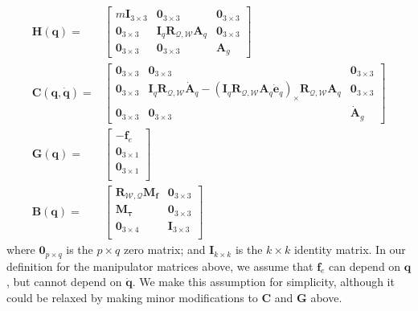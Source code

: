 \begin{equation}
\begin{aligned}
\mathbf{H}(\mathbf{q}) = &
\begin{bmatrix}
m\mathbf{I}_{3\times3} & \mathbf{0}_{3\times3} & \mathbf{0}_{3\times3} \\
\mathbf{0}_{3\times3}                          & \mathbf{I}_{q} \mathbf{R}_{\mathcal{Q},\mathcal{W}} \mathbf{A}_q & \mathbf{0}_{3\times3} \\
\mathbf{0}_{3\times3}                          & \mathbf{0}_{3\times3} & \mathbf{A}_{g}
\end{bmatrix} \\
%
\mathbf{C}(\mathbf{q},\dot{\mathbf{q}}) = &
\begin{bmatrix}
\mathbf{0}_{3\times3} & \mathbf{0}_{3\times3}  & \mathbf{0}_{3\times3} \\
\mathbf{0}_{3\times3} & \mathbf{I}_q \mathbf{R}_{\mathcal{Q},\mathcal{W}} \dot{\mathbf{A}}_q - \left(\mathbf{I}_q \mathbf{R}_{\mathcal{Q},\mathcal{W}} \mathbf{A}_q \dot{\mathbf{e}}_q \right)_{\times}\mathbf{R}_{\mathcal{Q},\mathcal{W}} \mathbf{A}_q & \mathbf{0}_{3\times3} \\
\mathbf{0}_{3\times3} & \mathbf{0}_{3\times3}  & \dot{\mathbf{A}}_g
\end{bmatrix} \\
%
\mathbf{G}(\mathbf{q}) = &
\begin{bmatrix}
-\mathbf{f}_e \\
\mathbf{0}_{3\times1} \\
\mathbf{0}_{3\times1} \\
\end{bmatrix} \\
%
\mathbf{B}(\mathbf{q}) = &
\begin{bmatrix}
\mathbf{R}_{\mathcal{W},\mathcal{Q}} \mathbf{M}_{\mathbf{f}}  & \mathbf{0}_{3\times3} \\
\mathbf{M}_{\mathbf{\tau}}                                    & \mathbf{0}_{3\times3} \\
\mathbf{0}_{3\times4}                                         & \mathbf{I}_{3\times3} \\
\end{bmatrix}
\end{aligned}
\end{equation}
%
where $\mathbf{0}_{p \times q}$ is the $p \times q$ zero matrix;
and $\mathbf{I}_{k \times k}$ is the $k \times k$ identity matrix.
In our definition for the manipulator matrices above, we assume that $\mathbf{f}_e$ can depend on $\mathbf{q}$, but cannot depend on $\dot{\mathbf{q}}$.
We make this assumption for simplicity, although it could be relaxed by making minor modifications to $\mathbf{C}$ and $\mathbf{G}$ above.

